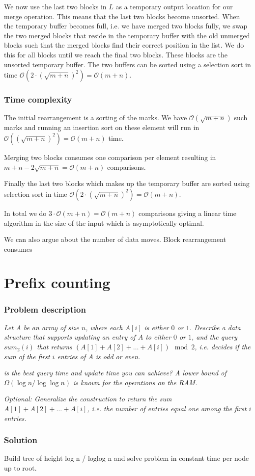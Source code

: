 \documentclass[a4paper,oneside,article,11pt]{memoir}
\begin{document}
We now use the last two blocks in $L$ as a temporary output location for our merge operation. This means that the last two blocks become unsorted. When the temporary buffer becomes full, i.e. we have merged two blocks fully, we swap the two merged blocks that reside in the temporary buffer with the old unmerged blocks such that the merged blocks find their correct position in the list. We do this for all blocks until we reach the final two blocks. These blocks are the unsorted temporary buffer. The two buffers can be sorted using a selection sort in time $\mathcal{O}(2\cdot\left(\sqrt{m+n}\right)^2) = \mathcal{O}(m+n)$.

\subsection{Time complexity}
The initial rearrangement is a sorting of the marks. We have $\mathcal{O}(\sqrt{m+n})$ such marks and running an insertion sort on these element will run in $\mathcal{O}( (\sqrt{m+n})^2) = \mathcal{O}(m+n)$ time.

Merging two blocks consumes one comparison per element resulting in $m+n - 2\sqrt{m+n} = \mathcal{O}(m+n)$ comparisons.

Finally the last two blocks which makes up the temporary buffer are sorted using selection sort in time $\mathcal{O}(2\cdot\left(\sqrt{m+n}\right)^2) = \mathcal{O}(m+n)$.

In total we do $3\cdot\mathcal{O}(m+n) = \mathcal{O}(m+n)$ comparisons giving a linear time algorithm in the size of the input which is asymptotically optimal.

We can also argue about the number of data moves. Block rearrangement consumes 

\chapter{Prefix counting}
\label{chp:prefix}
\subsection{Problem description}
\textit{Let $A$ be an array of size $n$, where each $A\left[i\right]$ is either $0$ or $1$. Describe a data structure that supports updating an entry of $A$ to either $0$ or $1$, and the query $sum_2\left(i\right)$ that returns $\left(A\left[1\right]+A\left[2\right]+\dots+A\left[i\right]\right) \mod 2$, i.e. decides if the sum of the first $i$ entries of $A$ is odd or even.}

\textit{ is the best query time and update time you can achieve? A lower bound of $\Omega(\log n/\log\log n)$ is known for the operations on the RAM.}

\textit{Optional: Generalize the construction to return the sum $A[1]+A[2]+\dots+A[i]$, i.e. the number of entries equal one among the first $i$ entries.}

\subsection{Solution}
Build tree of height log n / loglog n and solve problem in constant time per node up to root.


\end{document}
